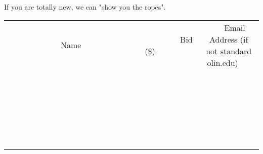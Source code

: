 \documentclass[11pt]{article}
\begin{document}
If you are totally new, we can "show you the ropes". \\[6ex]
\begin{tabular}{c c c}
~~~~~~~~~~~~~Name~~~~~~~~~~~~~ & ~~~~~~~~~Bid (\$)~~~~~~~~~ & ~~~Email Address (if not standard olin.edu)~~~ \\
 & & \\
\hline
 & & \\
\hline
 & & \\
\hline
 & & \\
\hline
 & & \\
\hline
 & & \\
\hline
 & & \\
\hline
 & & \\
\hline
 & & \\
\hline
 & & \\
\hline
 & & \\
\hline
 & & \\
\hline
 & & \\
\hline
 & & \\
\hline
 & & \\
\hline
 & & \\
\hline
 & & \\
\hline
 & & \\
\hline
 & & \\
\hline
 & & \\
\hline
 & & \\
\hline
 & & \\
\hline
 & & \\
\hline
 & & \\
\hline
 & & \\
\hline
 & & \\
\hline
\end{tabular}
\clearpage
\end{document}
